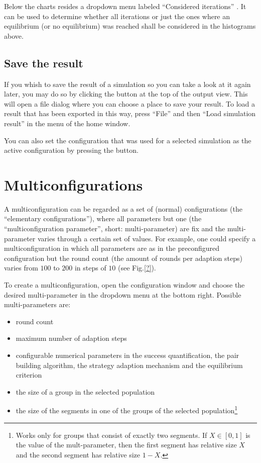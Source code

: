 \documentclass[parskip=full,11pt]{scrartcl}
\newcommand*\circled[1]{\tikz[baseline=(char.base)]{
            \node[shape=circle,draw,inner sep=2pt] (char) {#1};}}
\newlength\myheight
\newlength\mydepth
\newcommand*\inlinegraphics[1]{%
  \settototalheight\myheight{Xygp}%
  \settodepth\mydepth{Xygp}%
  \raisebox{-1.8\mydepth}{\texttt{[image: \#1]}}%
}
\begin{document}
Below the charts resides a dropdown menu labeled \enquote{Considered iterations} \circled{4}. It can be used to determine whether all iterations or just the ones where an equilibrium (or no equilibrium) was reached shall be considered in the histograms above.

\subsection{Save the result}
If you whish to save the result of a simulation so you can take a look at it again later, you may do so by clicking the  \inlinegraphics{img_manual/export_button.png} button at the top of the output view. This will open a file dialog where you can choose a place to save your result. To load a result that has been exported in this way, press \enquote{File} and then \enquote{Load simulation result} in the menu of the home window.

You can also set the configuration that was used for a selected simulation as the active configuration by pressing the  \inlinegraphics{img_manual/rotate_right_button.png} button.

\pagebreak
\section{Multiconfigurations}\label{sec:multi_config}
A multiconfiguration can be regarded as a set of (normal) configurations (the \enquote{elementary configurations}), where all parameters but one (the \enquote{multiconfiguration parameter}, short: multi-parameter) are fix and the multi-parameter varies through a certain set of values. For example, one could specify a multiconfiguration in which all parameters are as in the preconfigured configuration but the round count (the amount of rounds per adaption steps) varies from \(100\) to \(200\) in steps of \(10\) (see Fig.\ref{?}).

To create a multiconfiguration, open the configuration window and choose the desired multi-parameter in the dropdown menu at the bottom right. Possible multi-parameters are:
\begin{itemize}
\item round count
\item maximum number of adaption steps
\item configurable numerical parameters in the success quantification, the pair building algorithm, the strategy adaption mechanism and the equilibrium criterion
\item the size of a group in the selected population
\item the size of the segments in one of the groups of the selected population\footnote{Works only for groups that consist of exactly two segments. If \(X \in [0,1]\) is the value of the mult-parameter, then the first segment has relative size \(X\) and the second segment has relative size \(1 - X\).}
\end{itemize}
\end{document}
